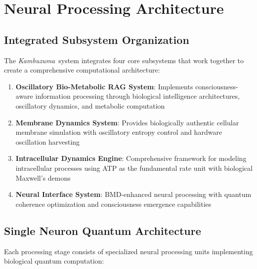 \documentclass[11pt,a4paper]{article}
\newcommand{\kambuzuma}{\textit{Kambuzuma}}
\begin{document}
\section{Neural Processing Architecture}

\subsection{Integrated Subsystem Organization}

The \kambuzuma\ system integrates four core subsystems that work together to create a comprehensive computational architecture:

\begin{enumerate}
\item \textbf{Oscillatory Bio-Metabolic RAG System}: Implements consciousness-aware information processing through biological intelligence architectures, oscillatory dynamics, and metabolic computation
\item \textbf{Membrane Dynamics System}: Provides biologically authentic cellular membrane simulation with oscillatory entropy control and hardware oscillation harvesting
\item \textbf{Intracellular Dynamics Engine}: Comprehensive framework for modeling intracellular processes using ATP as the fundamental rate unit with biological Maxwell's demons
\item \textbf{Neural Interface System}: BMD-enhanced neural processing with quantum coherence optimization and consciousness emergence capabilities
\end{enumerate}

\subsection{Single Neuron Quantum Architecture}

Each processing stage consists of specialized neural processing units implementing biological quantum computation:
\end{document}
